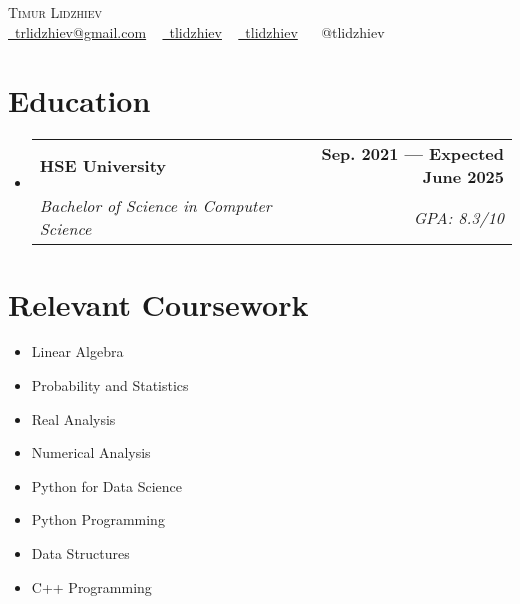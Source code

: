 \documentclass[letterpaper,11pt]{article}
\makeatletter
\newcommand{\resumeSubheading}[4]{
  \vspace{-2pt}\item
    \begin{tabular*}{1.0\textwidth}[t]{l@{\extracolsep{\fill}}r}
      \textbf{#1} & \textbf{\small #2} \\
      \textit{\small#3} & \textit{\small #4} \\
    \end{tabular*}\vspace{-7pt}
}
\newcommand{\resumeSubHeadingListStart}{\begin{itemize}[leftmargin=0.0in, label={}]}
\newcommand{\resumeSubHeadingListEnd}{\end{itemize}}
\makeatother
\begin{document}

\begin{center}
    {\Huge \scshape Timur Lidzhiev} \\ \vspace{1pt}
     \href{mailto:x@gmail.com}{\raisebox{-0.2\height}\faEnvelope\  trlidzhiev@gmail.com} ~
    \href{https://linkedin.com/in/tlidzhiev}{\raisebox{-0.2\height}\faLinkedin\ tlidzhiev}  ~
    \href{https://github.com/tlidzhiev}{\raisebox{-0.2\height}\faGithub\ tlidzhiev} ~ {\raisebox{-0.05\height}\faTelegram \ @tlidzhiev}
    \vspace{-8pt}
\end{center}


\section{Education}
  \resumeSubHeadingListStart
    \resumeSubheading
      {HSE University}{Sep. 2021 --- Expected June 2025}
      {Bachelor of Science in Computer Science}{GPA: 8.3/10}
  \resumeSubHeadingListEnd

\section{Relevant Coursework}
        \begin{multicols}{4}
            \begin{itemize}[itemsep=-5pt, parsep=3pt]
                \item Linear Algebra
                \item\small Probability and Statistics
                \item Real Analysis
                \item Numerical Analysis
                \item\small Python for Data Science
                \item Python Programming
                \item Data Structures
                \item C++ Programming
            \end{itemize}
        \end{multicols}
        \vspace*{2.0\multicolsep}
\end{document}
